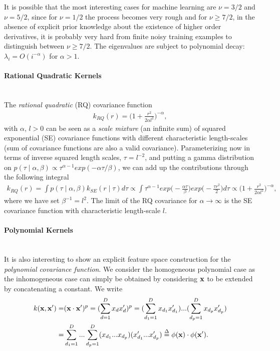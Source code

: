 \documentclass[article]{jss}
\begin{document}
It is possible that the most interesting cases for machine learning are $\nu=3/2$ and $\nu=5/2$, since for $\nu=1/2$ the process becomes very rough and for $\nu \geq 7/2$, in the absence of explicit prior knowledge about the existence of higher order derivatives, it is probably very hard from finite noisy training examples to distinguish between $\nu \geq 7/2$. The eigenvalues are subject to polynomial decay: $\lambda_i=O(i^{-\alpha})$ for $\alpha>1$.

\paragraph{Rational Quadratic Kernels}\mbox{}\\
The \emph{rational quadratic} (RQ) covariance function
\begin{align*}
k_{RQ}(r)=\Big(1+\frac{r^2}{2\alpha l^2}\Big)^{-\alpha},
\end{align*}
with $\alpha$, $l>0$ can be seen as a \emph{scale mixture} (an infinite sum) of squared exponential (SE) covariance functions with different characteristic length-scales (sum of covariance functions are also a valid covariance). Parameterizing now in terms of inverse squared length scales, $\tau=l^{-2}$, and putting a gamma distribution on $p(\tau\mid \alpha, \beta)\propto \tau^{\alpha-1} exp(-\alpha \tau/\beta)$, we can add up the contributions through the following integral
\begin{align*}
k_{RQ}(r)=\int p(\tau\mid \alpha, \beta)k_{SE}(r\mid \tau)d\tau \propto \int \tau^{\alpha-1} exp\Big(-\frac{\alpha \tau}{\beta}\Big)exp\Big(-\frac{\tau r^2}{2}\Big)d\tau \propto \Big(1+\frac{r^2}{2\alpha l^2}\Big)^{-\alpha},
\end{align*}
where we have set $\beta^{-1}=l^2$. The limit of the RQ covariance for $\alpha \rightarrow \infty$ is the SE covariance function with characteristic length-scale $l$. 

\paragraph{Polynomial Kernels}\mbox{}\\
It is also interesting to show an explicit feature space construction for the \emph{polynomial covariance function}. We consider the homogeneous polynomial case as the inhomogeneous case can simply be obtained by considering ${\bf x}$ to be extended by concatenating a constant. We write
\begin{align*}
k({\bf x}, {\bf x}')=&({\bf x} \cdot {\bf x}')^p=(\sum_{d=1}^D x_d x'_d)^p=(\sum_{d_1=1}^D x_{d_1} x'_{d_1})...(\sum_{d_p=1}^D x_{d_p} x'_{d_p})\\
=&\sum_{d_1=1}^D...\sum_{d_p=1}^D(x_{d_1}...x_{d_p})(x'_{d_1}...x'_{d_p})\overset{\Delta}=\phi({\bf x})\cdot \phi({\bf x}').
\end{align*}
\end{document}
